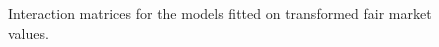 \begin{figure}[h!]
\caption{Interaction matrices for the models fitted on transformed fair market values.}\label{interactions_transformed_fmv}
\end{figure}

